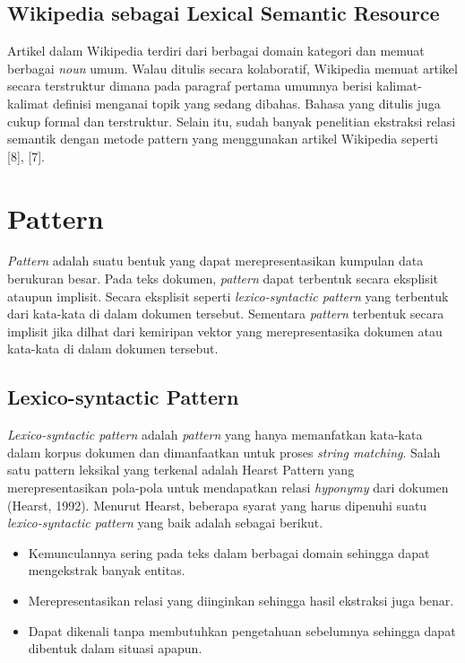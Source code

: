 \subsection{Wikipedia sebagai Lexical Semantic Resource}
Artikel dalam Wikipedia terdiri dari berbagai domain kategori dan memuat berbagai \textit{noun} umum. Walau ditulis secara kolaboratif, Wikipedia memuat artikel secara terstruktur dimana pada paragraf pertama umumnya berisi kalimat-kalimat definisi menganai topik yang sedang dibahas. Bahasa yang ditulis juga cukup formal dan terstruktur. Selain itu, sudah banyak penelitian ekstraksi relasi semantik dengan metode pattern yang menggunakan artikel Wikipedia seperti [8], [7]. 

\section{Pattern}
\textit{Pattern} adalah suatu bentuk yang dapat merepresentasikan kumpulan data berukuran besar. Pada teks dokumen, \textit{pattern} dapat terbentuk secara eksplisit ataupun implisit. Secara eksplisit seperti \textit{lexico-syntactic pattern} yang terbentuk dari kata-kata di dalam dokumen tersebut. Sementara \textit{pattern} terbentuk secara implisit jika dilhat dari kemiripan vektor yang merepresentasika dokumen atau kata-kata di dalam dokumen tersebut.

\subsection{Lexico-syntactic Pattern}
\textit{Lexico-syntactic pattern} adalah \textit{pattern} yang hanya memanfatkan kata-kata dalam korpus dokumen dan dimanfaatkan untuk proses \textit{string matching}. Salah satu pattern leksikal yang terkenal adalah Hearst Pattern yang merepresentasikan pola-pola untuk mendapatkan relasi \textit{hyponymy} dari dokumen (Hearst, 1992). Menurut Hearst, beberapa syarat yang harus dipenuhi suatu \textit{lexico-syntactic pattern} yang baik adalah sebagai berikut.
\begin{itemize}
  \item Kemunculannya sering pada teks dalam berbagai domain sehingga dapat mengekstrak banyak entitas.
  \item Merepresentasikan relasi yang diinginkan sehingga hasil ekstraksi juga benar.
  \item Dapat dikenali tanpa membutuhkan pengetahuan sebelumnya sehingga dapat dibentuk dalam situasi apapun.
\end{itemize}

